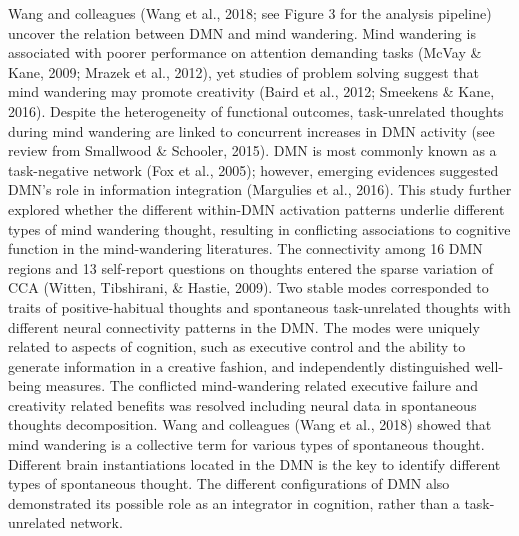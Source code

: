 Wang and colleagues (Wang et al., 2018; see Figure 3 for the analysis pipeline) uncover the relation between DMN and mind wandering. Mind wandering is associated with poorer performance on attention demanding tasks (McVay \& Kane, 2009; Mrazek et al., 2012), yet studies of problem solving suggest that mind wandering may promote creativity (Baird et al., 2012; Smeekens \& Kane, 2016). Despite the heterogeneity of functional outcomes, task-unrelated thoughts during mind wandering are linked to concurrent increases in DMN activity (see review from Smallwood \& Schooler, 2015). DMN is most commonly known as a task-negative network (Fox et al., 2005); however, emerging evidences suggested DMN’s role in information integration (Margulies et al., 2016). This study further explored whether the different within-DMN activation patterns underlie different types of mind wandering thought, resulting in conflicting associations to cognitive function in the mind-wandering literatures. The connectivity among 16 DMN regions and 13 self-report questions on thoughts entered the sparse variation of CCA (Witten, Tibshirani, \& Hastie, 2009). Two stable modes corresponded to traits of positive-habitual thoughts and spontaneous task-unrelated thoughts with different neural connectivity patterns in the DMN. The modes were uniquely related to aspects of cognition, such as executive control and the ability to generate information in a creative fashion, and independently distinguished well-being measures. The conflicted mind-wandering related executive failure and creativity related benefits was resolved including neural data in spontaneous thoughts decomposition. Wang and colleagues (Wang et al., 2018) showed that mind wandering is a collective term for various types of spontaneous thought. Different brain instantiations located in the DMN is the key to identify different types of spontaneous thought. The different configurations of DMN also demonstrated its possible role as an integrator in cognition, rather than a task-unrelated network.


